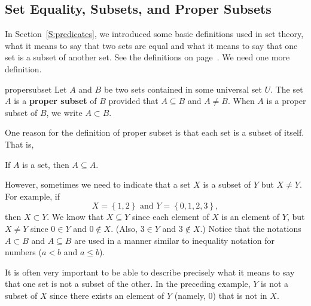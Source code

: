 \subsection*{Set Equality, Subsets, and Proper Subsets} \label{ss:propersubset} 
In Section~\ref{S:predicates}, we introduced some basic definitions used in set theory, what it means to say that two sets are equal and what it means to say that one set is a subset of another set.  See the definitions on page~\pageref{D:setequality}.  We need one more definition.

\begin{defbox}{propersubset}{
Let $A$ and $B$ be two sets contained in some universal set $U$.  The set  $A$  is a \textbf{proper subset} \label{sym:propersub}
%
%
of $B$ provided that $A \subseteq B$ and  $A \ne B$.  When $A$ is a proper subset of $B$, we write $A \subset B$.}
\end{defbox}

  
One reason for the definition of proper subset is that each set is a subset of itself.  That is, 
\begin{center}
If  $A$  is a set, then  $A \subseteq A$.
\end{center}
%
However, sometimes we need to indicate that a set  $X$  is a subset of  $Y$  but  $X \ne Y$. For example, if
\[
X = \left\{ {1, 2} \right\}\text{  and  }Y = \left\{ {0, 1, 2, 3} \right\}\!,
\]
then  $X \subset Y$.  We know that  $X \subseteq Y$ since each element of  $X$  is an element of  $Y$, but  $X \ne Y$ since  $0 \in Y$  and  $0 \notin X$.  (Also, $3 \in Y$  and   $3 \notin X$.)   Notice that the notations  $A \subset B$  and  $A \subseteq B$ are used in a manner similar to inequality notation for numbers ($a < b$  and  $a \leq b$).

It is often very important to be able to describe precisely what it means to say that one set is not a subset of the other.  In the preceding example,  $Y$  is not a subset of  $X$  since there exists an element of $Y$ 
(namely, 0) that is not in $X$.  

